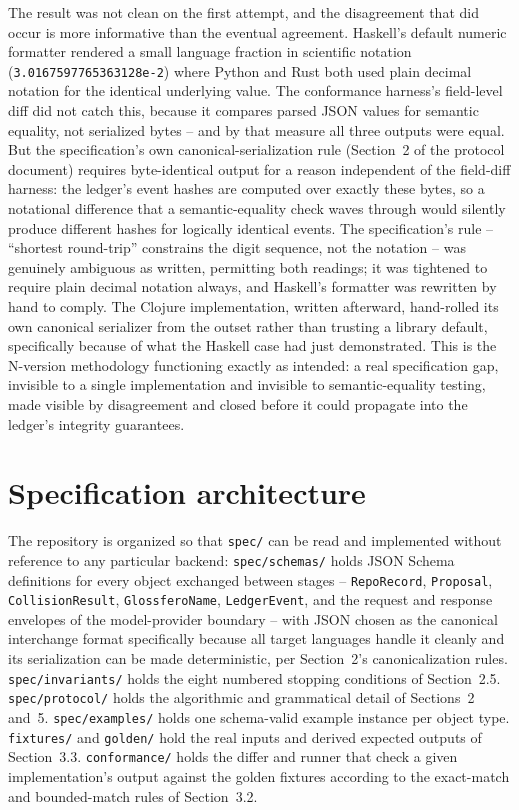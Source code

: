 \documentclass[11pt]{article}
\begin{document}
The result was not clean on the first attempt, and the disagreement that did occur is more informative than the eventual agreement. Haskell's default numeric formatter rendered a small language fraction in scientific notation (\texttt{3.0167597765363128e-2}) where Python and Rust both used plain decimal notation for the identical underlying value. The conformance harness's field-level diff did not catch this, because it compares parsed JSON values for semantic equality, not serialized bytes -- and by that measure all three outputs were equal. But the specification's own canonical-serialization rule (Section~2 of the protocol document) requires byte-identical output for a reason independent of the field-diff harness: the ledger's event hashes are computed over exactly these bytes, so a notational difference that a semantic-equality check waves through would silently produce different hashes for logically identical events. The specification's rule -- ``shortest round-trip'' constrains the digit sequence, not the notation -- was genuinely ambiguous as written, permitting both readings; it was tightened to require plain decimal notation always, and Haskell's formatter was rewritten by hand to comply. The Clojure implementation, written afterward, hand-rolled its own canonical serializer from the outset rather than trusting a library default, specifically because of what the Haskell case had just demonstrated. This is the N-version methodology functioning exactly as intended: a real specification gap, invisible to a single implementation and invisible to semantic-equality testing, made visible by disagreement and closed before it could propagate into the ledger's integrity guarantees.


\section{Specification architecture}

The repository is organized so that \texttt{spec/} can be read and implemented without reference to any particular backend: \texttt{spec/schemas/} holds JSON Schema definitions for every object exchanged between stages -- \texttt{RepoRecord}, \texttt{Proposal}, \texttt{CollisionResult}, \texttt{GlossferoName}, \texttt{LedgerEvent}, and the request and response envelopes of the model-provider boundary -- with JSON chosen as the canonical interchange format specifically because all target languages handle it cleanly and its serialization can be made deterministic, per Section~2's canonicalization rules. \texttt{spec/invariants/} holds the eight numbered stopping conditions of Section~2.5. \texttt{spec/protocol/} holds the algorithmic and grammatical detail of Sections~2 and~5. \texttt{spec/examples/} holds one schema-valid example instance per object type. \texttt{fixtures/} and \texttt{golden/} hold the real inputs and derived expected outputs of Section~3.3. \texttt{conformance/} holds the differ and runner that check a given implementation's output against the golden fixtures according to the exact-match and bounded-match rules of Section~3.2.
\end{document}
